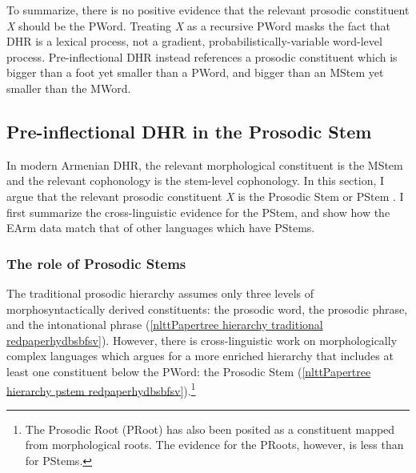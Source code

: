 To summarize, there is no positive evidence that the relevant prosodic constituent \textit{X} should be the PWord. Treating \textit{X} as a recursive PWord masks the fact that DHR is a lexical process, not a gradient, probabilistically-variable word-level process. Pre-inflectional DHR instead references a prosodic constituent which is bigger than a foot yet smaller than a PWord, and bigger than an MStem yet smaller than the MWord. %


\subsection{Pre-inflectional DHR in the Prosodic Stem}\label{nlttPapersection: reduction: destressed reduction EA: pstem}


In modern Armenian DHR, the relevant morphological constituent is the MStem and the relevant cophonology is the stem-level cophonology. In this section, I argue that the relevant prosodic constituent \textit{X} is the Prosodic Stem or PStem \citep{Downing-1999-ProsodicStem}. I first summarize the cross-linguistic evidence for the PStem, and show how the EArm data match that of other languages which have PStems. 

\subsubsection{The role of Prosodic Stems}\label{nlttPapersection: reduction: destressed reduction EA: pstem: role}

The traditional prosodic hierarchy assumes only three levels of morphosyntactically derived constituents: the prosodic word, the prosodic phrase, and the intonational phrase (\ref{nlttPapertree hierarchy traditional redpaperhydbsbfsv}). However, there is cross-linguistic work on morphologically complex languages which argues for a more enriched hierarchy that includes at least one constituent below the PWord: the Prosodic Stem (\ref{nlttPapertree hierarchy pstem redpaperhydbsbfsv}).\footnote{The Prosodic Root (PRoot) has also been posited as a constituent mapped from morphological roots. The evidence for the PRoots, however, is less than for PStems. } 



